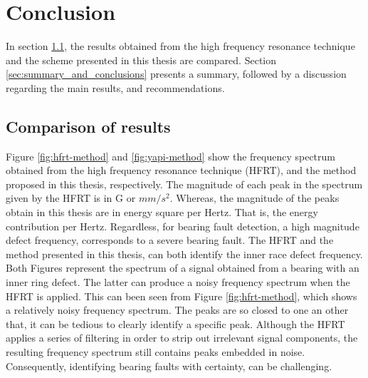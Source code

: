 \documentclass[../Main/thesis.tex]{subfiles}
\begin{document}
	\chapter[Conclusions]{Conclusion}
	\label{sec:conclusions}
	 In section \ref{sec:comp}, the results obtained from the high frequency resonance technique and the scheme presented in this thesis are compared.
	 Section \ref{sec:summary_and_conclusions} presents a summary, followed by a discussion regarding the main results, and recommendations.

	
	\section{Comparison of results}
		\label{sec:comp}
	Figure \ref{fig:hfrt-method} and \ref{fig:yapi-method} show the frequency spectrum obtained from the high frequency resonance technique (HFRT), and the method proposed in this thesis, respectively. The magnitude of each peak in the spectrum given by the HFRT is in G or $mm/s^{2}$. Whereas, the magnitude of the peaks obtain in this thesis are in energy square per Hertz. That is, the energy contribution per Hertz. Regardless, for bearing fault detection, a high magnitude defect frequency, corresponds to a severe bearing fault. The HFRT and the method presented in this thesis, can both identify the inner race defect frequency.
	\justify
	 Both Figures represent the spectrum of a signal obtained from a bearing with an inner ring defect. The latter can produce a noisy frequency spectrum when the HFRT is applied. This can been seen from Figure \ref{fig:hfrt-method}, which shows a relatively noisy frequency spectrum. The peaks are so closed to one an other that, it can be tedious to clearly identify a specific peak.
	Although the HFRT applies a series of filtering in order to strip out irrelevant signal components, the resulting frequency spectrum still contains  peaks embedded in noise. Consequently, identifying bearing faults with certainty, can be challenging. 
	
\end{document}

